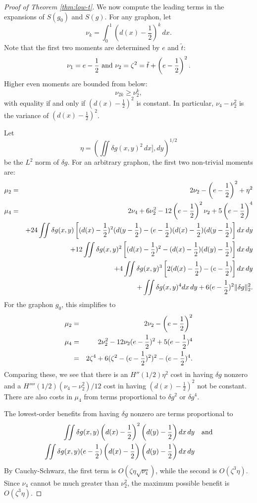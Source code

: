 \documentclass[12pt]{amsart}
\newcommand{\1}{\mathbf{1}}
\begin{document}
\begin{proof}[Proof of Theorem \ref{thm:low-t}]
\smallskip

 We now compute the leading terms in the expansions of $S(g_0)$ and $S(g)$. For any graphon, 
let 
\begin{equation}
\nu_k = \int_0^1 \left (d(x) - \frac12 \right)^k \, dx. 
\end{equation}
Note that the first two moments are determined by $e$ and $\tilde t$:
\begin{equation} \nu_1= e - \frac12 \hbox{ and } \nu_2 = \zeta^2 = \tilde t + \left ( e - \frac12 \right )^2. 
\end{equation} 
Higher even moments are bounded from below: 
\begin{equation} 
\nu_{2k} \ge \nu_2^k,
\end{equation}
with equality if and only if $\left( d(x)-\frac12 \right )^2$ is constant. In particular, $\nu_4-\nu_2^2$ is the variance of 
 $\left( d(x)-\frac12 \right )^2$.

 Let 
 \[ \eta = \left ( \iint \delta g(x,y)^2 \, dx], dy \right )^{1/2} \]
 be the $L^2$ norm of $\delta g$. For an arbitrary graphon, the first two non-trivial moments are:
 \begin{eqnarray}
 \mu_2 & = & 2 \nu_2 - \left ( e - \frac12\right )^2 + \eta^2 \cr 
 \mu_4 & = & 2 \nu_4 +  6\nu_2^2 - 12 \left (e-\frac12\right)^2 \nu_2 + 5\left (e-\frac12\right)^4 \cr 
 && + 24 \iint \delta g(x,y) \left [ (d(x)-\frac12)^2(d(y-\frac12)- (e-\frac12) (d(x)-\frac12)(d(y-\frac12)\right ]   dx \, dy \cr 
 && + 12 \iint \delta g(x,y)^2 \left [ (d(x)-\frac12)^2- (d(x)-\frac12)(d(y)-\frac12)\right ]   dx \, dy \cr
  && + 4 \iint \delta g(x,y)^3 \left [ 2(d(x)-\frac12)- (e-\frac12) \right ]   dx \, dy \cr
  && + \iint \delta g(x,y)^4  dx \, dy + 6 (e-\frac12)^2 \|\delta g\|_2^2. 
 \end{eqnarray}
 For the graphon $g_0$, this simplifies to 
  \begin{eqnarray}
 \mu_2 & = & 2 \nu_2 - \left ( e - \frac12\right )^2  \cr 
 \mu_4 & = & 2 \nu_2^2 -12 \nu_2 (e-\frac12)^2 + 5(e-\frac12)^4 \cr 
 & = & 2\zeta^4 + 6 (\zeta^2 - (e-\frac12)^2)^2 - (e-\frac12)^4. 
 \end{eqnarray}
Comparing these, we see that there is an $H''(1/2)\eta^2$ cost in having $\delta g$ nonzero and a $H''''(1/2) (\nu_4-\nu_2^2)/12$ 
cost in having $(d(x) - \frac12)^2$ not be constant. There are also costs in $\mu_4$ from terms proportional to $\delta g^2$ or $\delta g^4$. 

The lowest-order benefits from having $\delta g$ nonzero are terms proportional to 
\begin{eqnarray}
\iint \delta g(x,y) \left (d(x)-\frac12 \right )^2\left ( d(y)-\frac12 \right ) dx\, dy &&  \hbox{and} \cr 
\iint \delta g(x,y) (e - \frac12) \left (d(x)-\frac12 \right )\left ( d(y)-\frac12 \right ) dx\, dy && \end{eqnarray}
By Cauchy-Schwarz, the first term is $O(\zeta \eta \sqrt{\nu_4})$, while the second 
is $O(\zeta^3\eta)$. 
Since $\nu_4$ cannot be much greater than $\nu_2^2$, the maximum possible 
benefit is $O(\zeta^3\eta)$. 


\end{proof}
\end{document}
